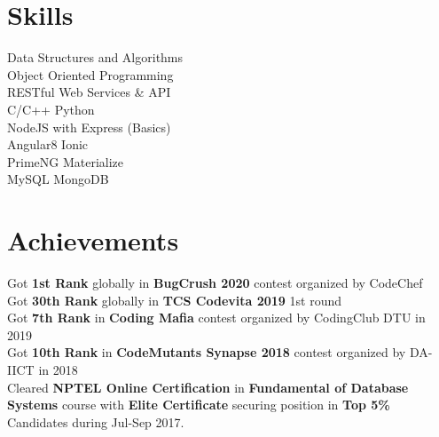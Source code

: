 \documentclass[]{jaydeep-resume-openfont}
\begin{document}
\begin{minipage}[t]{0.29\textwidth}




\section{Skills}

\textbullet{} Data Structures and Algorithms \\
\textbullet{} Object Oriented Programming \\
\textbullet{} RESTful Web Services \& API  \\
\textbullet{} C/C++ \textbullet{} Python \\
\textbullet{}  NodeJS with Express (Basics)\\
\textbullet{} Angular8 \textbullet{} Ionic \\
\textbullet{} PrimeNG \textbullet{} Materialize \\
\textbullet{} MySQL \textbullet{} MongoDB \\
\sectionsep


\section{Achievements}

\textbullet{} Got \textbf{1st Rank} globally in \textbf{BugCrush 2020} contest organized by CodeChef\\
\textbullet{} Got \textbf{30th Rank} globally in \textbf{TCS Codevita 2019} 1st round\\
\textbullet{} Got \textbf{7th Rank} in \textbf{Coding Mafia} contest organized by CodingClub DTU in 2019\\
\textbullet{} Got \textbf{10th Rank} in \textbf{CodeMutants Synapse 2018} contest organized by DA-IICT in 2018\\
\textbullet{} Cleared \textbf{NPTEL Online Certification} in \textbf{Fundamental of Database Systems} course with \textbf{Elite Certificate} securing position in \textbf{Top 5\%} Candidates during Jul-Sep 2017.\\
\sectionsep


\end{minipage}
\end{document}
